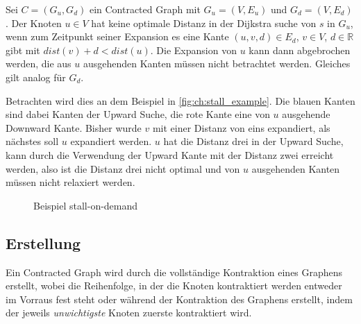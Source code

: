 \begin{definition}
    Sei $C = (G_u, G_d)$ ein Contracted Graph mit $G_u = (V, E_u)$ und $G_d = (V, E_d)$.
    Der Knoten $u \in V$ hat keine optimale Distanz in der Dijkstra suche von $s$ in $G_u$, wenn zum Zeitpunkt seiner Expansion es eine Kante $(u, v, d) \in E_d$, $v \in V$, $d \in \mathbb{R}$ gibt mit ${dist}(v) + d < {dist}(u)$.
    Die Expansion von $u$ kann dann abgebrochen werden, die aus $u$ ausgehenden Kanten müssen nicht betrachtet werden.
    Gleiches gilt analog für $G_d$.
\end{definition}

Betrachten wird dies an dem Beispiel in \autoref{fig:ch:stall_example}.
Die blauen Kanten sind dabei Kanten der Upward Suche, die rote Kante eine von $u$ ausgehende Downward Kante.
Bisher wurde $v$ mit einer Distanz von eins expandiert, als nächstes soll $u$ expandiert werden.
$u$ hat die Distanz drei in der Upward Suche, kann durch die Verwendung der Upward Kante mit der Distanz zwei erreicht werden, also ist die Distanz drei nicht optimal und von $u$ ausgehenden Kanten müssen nicht relaxiert werden.

\begin{figure}
    \centering
    \caption{Beispiel stall-on-demand}
    \label{fig:ch:stall_example}
\end{figure}

\subsection{Erstellung}

Ein Contracted Graph wird durch die vollständige Kontraktion eines Graphens erstellt, wobei die Reihenfolge, in der die Knoten kontraktiert werden entweder im Vorraus fest steht oder während der Kontraktion des Graphens erstellt, indem der jeweils \emph{unwichtigste} Knoten zuerste kontraktiert wird.

